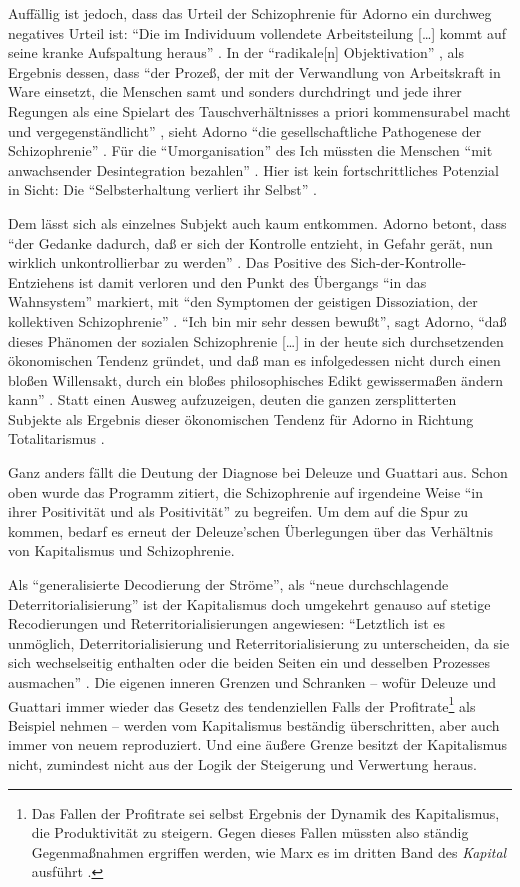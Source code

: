 \documentclass[12pt,
               paper=a4,
               twoside=false,
               onehalfspacing,
               bibliography=totoc,
               toc=graduated,
               ]{scrartcl}
\newcommand{\lips}{\dots\unkern}
\newcommand{\pc}[2]{\parencite[#1]{#2}}
\newcommand{\vgl}[2]{\parencite[vgl.][#1]{#2}}
\newcommand{\dg}{Deleuze und Guattari\xspace}
\begin{document}
Auffällig ist jedoch, dass das Urteil der Schizophrenie für Adorno ein
durchweg negatives Urteil ist: "`Die im Individuum vollendete
Arbeitsteilung [\lips] kommt auf seine kranke Aufspaltung heraus"'
\pc{263}{min}. In der "`radikale[n] Objektivation"' \pc{263}{min}, als
Ergebnis dessen, dass "`der Prozeß, der mit der Verwandlung von
Arbeitskraft in Ware einsetzt, die Menschen samt und sonders
durchdringt und jede ihrer Regungen als eine Spielart des
Tauschverhältnisses a priori kommensurabel macht und
vergegenständlicht"' \pc{262}{min}, sieht Adorno "`die
gesellschaftliche Pathogenese der Schizophrenie"' \pc{263}{min}. Für
die "`Umorganisation"' \pc{263}{min} des Ich müssten die Menschen
"`mit anwachsender Desintegration bezahlen"' \pc{263}{min}. Hier ist
kein fortschrittliches Potenzial in Sicht: Die "`Selbsterhaltung
verliert ihr Selbst"' \pc{263}{min}.

Dem lässt sich als einzelnes Subjekt auch kaum entkommen. Adorno
betont, dass "`der Gedanke dadurch, daß er sich der Kontrolle
entzieht, in Gefahr gerät, nun wirklich unkontrollierbar zu werden"'
\pc{229}{vla}. Das Positive des Sich-der-Kontrolle-Entziehens ist
damit verloren und den Punkt des Übergangs "`in das
Wahnsystem"' \pc{229}{vla} markiert, mit "`den Symptomen der geistigen
Dissoziation, der kollektiven Schizophrenie"' \pc{229}{vla}. "`Ich bin
mir sehr dessen bewußt"', sagt Adorno, "`daß dieses Phänomen der
sozialen Schizophrenie [\lips] in der heute sich durchsetzenden
ökonomischen Tendenz gründet, und daß man es infolgedessen nicht durch
einen bloßen Willensakt, durch ein bloßes philosophisches Edikt
gewissermaßen ändern kann"' \pc{274}{vla}. Statt einen Ausweg
aufzuzeigen, deuten die ganzen zersplitterten Subjekte als Ergebnis
dieser ökonomischen Tendenz für Adorno in Richtung Totalitarismus
\vgl{263}{min}.

Ganz anders fällt die Deutung der Diagnose bei \dg aus. Schon oben
wurde das Programm zitiert, die Schizophrenie auf irgendeine Weise
"`in ihrer Positivität und als Positivität"' \pc{24}{schizg} zu
begreifen. Um dem auf die Spur zu kommen, bedarf es erneut der
Deleuze'schen Überlegungen über das Verhältnis von Kapitalismus und
Schizophrenie.

Als "`generalisierte Decodierung der Ströme"', als "`neue
durchschlagende Deterritorialisierung"' \pc{288}{ao} ist der
Kapitalismus doch umgekehrt genauso auf stetige Recodierungen und
Reterritorialisierungen angewiesen: "`Letztlich ist es unmöglich,
Deterritorialisierung und Reterritorialisierung zu unterscheiden, da
sie sich wechselseitig enthalten oder die beiden Seiten ein und
desselben Prozesses ausmachen"' \pc{333}{ao}. Die eigenen inneren
Grenzen und Schranken -- wofür \dg immer wieder das Gesetz des
tendenziellen Falls der Profitrate\footnote{Das Fallen der Profitrate
sei selbst Ergebnis der Dynamik des Kapitalismus, die Produktivität zu
steigern. Gegen dieses Fallen müssten also ständig Gegenmaßnahmen
ergriffen werden, wie Marx es im dritten Band des \emph{Kapital}
ausführt \vgl{221-277}{kap3}.} als Beispiel nehmen \vgl{S. 334 f.}{ao}
-- werden vom Kapitalismus beständig überschritten, aber auch immer
von neuem reproduziert. Und eine äußere Grenze besitzt der
Kapitalismus nicht, zumindest nicht aus der Logik der Steigerung und
Verwertung heraus.
\end{document}
